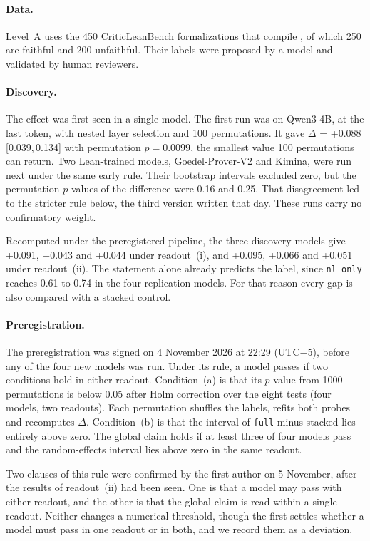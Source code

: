 \documentclass[10pt]{article}
\newcommand{\vr}[1]{\texttt{#1}}
\newcommand{\D}{\Delta}
\newcommand{\ic}[2]{[#1,\,#2]}
\begin{document}
\paragraph{Data.}
Level~A uses the 450 CriticLeanBench formalizations that compile \citep{criticlean}, of which 250 are faithful and
200 unfaithful. Their labels were proposed by a model and validated by human reviewers.

\paragraph{Discovery.}
The effect was first seen in a single model. The first run was on Qwen3-4B, at the last token, with nested layer
selection and 100 permutations. It gave
$\D$ = +0.088 \ic{0.039}{0.134} with permutation $p = 0.0099$, the smallest value 100 permutations can return. Two
Lean-trained models, Goedel-Prover-V2 and Kimina, were run next under the same early rule. Their bootstrap intervals
excluded zero, but the permutation $p$-values of the difference were 0.16 and 0.25. That disagreement led to the
stricter rule below, the third version written that day. These runs carry no confirmatory weight.

Recomputed under the preregistered pipeline, the three discovery models give +0.091, +0.043 and +0.044 under
readout~(i), and +0.095, +0.066 and +0.051 under readout~(ii). The statement alone already predicts the label,
since \vr{nl\_only} reaches 0.61 to 0.74 in the four replication models. For that reason every gap is also compared
with a stacked control.

\paragraph{Preregistration.}
The preregistration was signed on 4 November 2026 at 22:29 (UTC$-$5), before any of the four new models was run.
Under its rule, a model passes if two conditions hold in either readout. Condition~(a) is that its $p$-value from
1000 permutations is below 0.05 after Holm correction \citep{holm} over the eight tests (four models, two
readouts). Each permutation shuffles the labels, refits both probes and recomputes $\D$. Condition~(b) is that the
interval of \vr{full} minus stacked lies entirely above zero. The global claim holds if at least three of four
models pass and the random-effects interval lies above zero in the same readout.

Two clauses of this rule were confirmed by the first author on 5 November, after the results of readout~(ii) had
been seen. One is that a model may pass with either readout, and the other is that the global claim is read within a
single readout. Neither changes a numerical threshold, though the first settles whether a model must pass in one
readout or in both, and we record them as a deviation.
\end{document}
